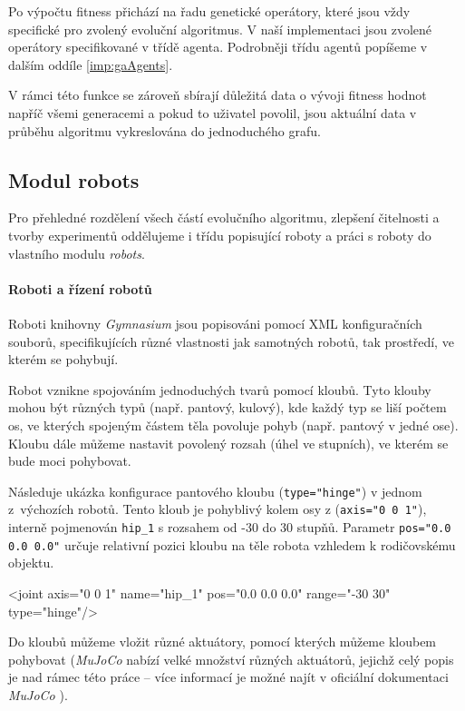 Po výpočtu fitness přichází na řadu genetické operátory, které jsou vždy
specifické pro zvolený evoluční algoritmus. V naší implementaci jsou zvolené
operátory specifikované v třídě agenta. Podrobněji třídu agentů
popíšeme v dalším oddíle \ref{imp:gaAgents}.

V rámci této funkce se zároveň sbírají důležitá data o vývoji fitness hodnot
napříč všemi generacemi a pokud to uživatel povolil, jsou aktuální data v
průběhu algoritmu vykreslována do jednoduchého grafu.

\subsection{Modul robots} \label{imp:robots}
Pro přehledné rozdělení všech částí evolučního algoritmu, zlepšení čitelnosti a
tvorby experimentů oddělujeme i třídu popisující roboty a práci s roboty do
vlastního modulu \emph{robots}. 

\paragraph{Roboti a řízení robotů}
Roboti knihovny \emph{Gymnasium} jsou popisováni pomocí XML konfiguračních
souborů, specifikujících různé vlastnosti jak samotných robotů, tak prostředí,
ve kterém se pohybují. 

Robot vznikne spojováním jednoduchých tvarů pomocí kloubů. Tyto klouby mohou
být různých typů (např. pantový, kulový), kde každý typ se liší počtem os, ve
kterých spojeným částem těla povoluje pohyb (např. pantový v jedné ose).
Kloubu dále můžeme nastavit povolený rozsah (úhel ve stupních), ve kterém se
bude moci pohybovat. 

Následuje ukázka konfigurace pantového kloubu (\texttt{type="hinge"}) v jednom
z~výchozích robotů. Tento kloub je pohyblivý kolem osy z (\texttt{axis="0 0
1"}), interně pojmenován \texttt{hip\_1} s rozsahem od -30 do 30 stupňů.
Parametr \texttt{pos="0.0 0.0 0.0"} určuje relativní pozici kloubu na těle
robota vzhledem k rodičovskému objektu. 
\begin{code} 
<joint axis="0 0 1" name="hip_1" pos="0.0 0.0 0.0" range="-30 30" 
 type="hinge"/>
\end{code}

Do kloubů můžeme vložit různé aktuátory, pomocí kterých můžeme kloubem
pohybovat (\emph{MuJoCo} nabízí velké množství různých aktuátorů, jejichž celý
popis je nad rámec této práce -- více informací je možné najít v oficiální
dokumentaci \emph{MuJoCo} \citep{modeling-mujocodocumentation}). 

